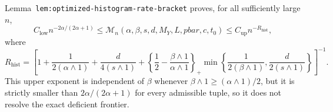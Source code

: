 Lemma~\texttt{lem:optimized-histogram-rate-bracket} proves, for all sufficiently large \(n\),
\[
C_{\mathrm{low}}n^{-2\alpha/(2\alpha+1)}
\le \mathcal M_n(\alpha,\beta,s,d,M_Y,L,pbar,c,t_0)
\le C_{\mathrm{up}}n^{-R_{\mathrm{hist}}},
\]
where
\[
R_{\mathrm{hist}}=
\left[
1+\frac{1}{2(\alpha\wedge1)}+\frac{d}{4(s\wedge1)}
+\left\{\frac12-\frac{\beta\wedge1}{\alpha\wedge1}\right\}_+
\min\left\{\frac{1}{2(\beta\wedge1)},\frac{d}{2(s\wedge1)}\right\}
\right]^{-1}.
\]
This upper exponent is independent of \(\beta\) whenever \(\beta\wedge1\ge(\alpha\wedge1)/2\), but it is strictly smaller than \(2\alpha/(2\alpha+1)\) for every admissible tuple, so it does not resolve the exact deficient frontier.